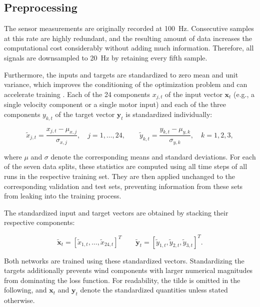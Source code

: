 \subsection{Preprocessing}
\label{sec:4.2.2Preprocessing}

The sensor measurements are originally recorded at \SI{100}{\hertz}. Consecutive samples at this rate are highly redundant, and the resulting amount of data increases the computational cost considerably without adding much information. Therefore, all signals are downsampled to \SI{20}{\hertz} by retaining every fifth sample.

Furthermore, the inputs and targets are standardized to zero mean and unit variance, which improves the conditioning of the optimization problem and can accelerate training \cite{Lecun2000EffBackProp}. Each of the 24 components $x_{j,t}$ of the input vector $\bm{x}_t$ (e.g., a single velocity component or a single motor input) and each of the three components $y_{k,t}$ of the target vector $\bm{y}_t$ is standardized individually:

\begin{equation}
	\tilde{x}_{j,t} = \frac{x_{j,t} - \mu_{x,j}}{\sigma_{x,j}}, \quad j = 1, \dots, 24, \qquad
	\tilde{y}_{k,t} = \frac{y_{k,t} - \mu_{y,k}}{\sigma_{y,k}}, \quad k = 1, 2, 3,
	\label{eq:standardization}
\end{equation}

where $\mu$ and $\sigma$ denote the corresponding means and standard deviations. For each of the seven data splits, these statistics are computed using all time steps of all runs in the respective training set. They are then applied unchanged to the corresponding validation and test sets, preventing information from these sets from leaking into the training process.

The standardized input and target vectors are obtained by stacking their respective components:

\begin{equation}
	\tilde{\bm{x}}_t = [\tilde{x}_{1,t}, \dots, \tilde{x}_{24,t}]^T 
	\qquad
	\tilde{\bm{y}}_t = [\tilde{y}_{1,t}, \tilde{y}_{2,t}, \tilde{y}_{3,t}]^T.
\end{equation}

Both networks are trained using these standardized vectors. Standardizing the targets additionally prevents wind components with larger numerical magnitudes from dominating the loss function.
For readability, the tilde is omitted in the following, and $\bm{x}_t$ and $\bm{y}_t$ denote the standardized quantities unless stated otherwise.





